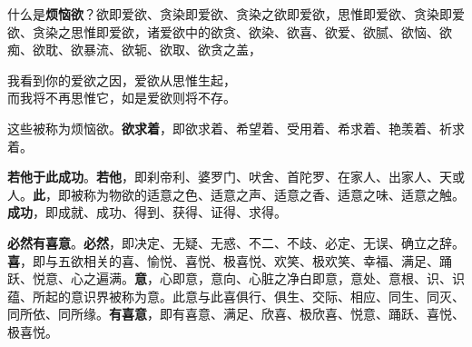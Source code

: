 什么是\textbf{烦恼欲}？欲即爱欲、贪染即爱欲、贪染之欲即爱欲，思惟即爱欲、贪染即爱欲、贪染之思惟即爱欲，诸爱欲中的欲贪、欲染、欲喜、欲爱、欲腻、欲恼、欲痴、欲耽、欲暴流、欲轭、欲取、欲贪之盖，


\begin{quoting}我看到你的爱欲之因，爱欲从思惟生起，\\而我将不再思惟它，如是爱欲则将不存。\end{quoting}


这些被称为烦恼欲。\textbf{欲求着}，即欲求着、希望着、受用着、希求着、艳羡着、祈求着。


\textbf{若他于此成功}。\textbf{若他}，即刹帝利、婆罗门、吠舍、首陀罗、在家人、出家人、天或人。\textbf{此}，即被称为物欲的适意之色、适意之声、适意之香、适意之味、适意之触。\textbf{成功}，即成就、成功、得到、获得、证得、求得。


\textbf{必然有喜意}。\textbf{必然}，即决定、无疑、无惑、不二、不歧、必定、无误、确立之辞。\textbf{喜}，即与五欲相关的喜、愉悦、喜悦、极喜悦、欢笑、极欢笑、幸福、满足、踊跃、悦意、心之遍满。\textbf{意}，心即意，意向、心脏之净白即意，意处、意根、识、识蕴、所起的意识界被称为意。此意与此喜俱行、俱生、交际、相应、同生、同灭、同所依、同所缘。\textbf{有喜意}，即有喜意、满足、欣喜、极欣喜、悦意、踊跃、喜悦、极喜悦。


